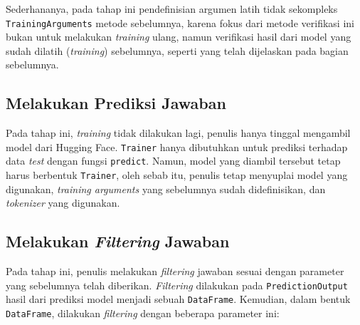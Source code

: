 Sederhananya, pada tahap ini pendefinisian argumen latih tidak sekompleks \texttt{TrainingArguments} metode sebelumnya, karena fokus dari metode verifikasi ini bukan untuk melakukan \emph{training} ulang, namun verifikasi hasil dari model yang sudah dilatih (\emph{training}) sebelumnya, seperti yang telah dijelaskan pada bagian sebelumnya.

\subsection{Melakukan Prediksi Jawaban}
Pada tahap ini, \emph{training} tidak dilakukan lagi, penulis hanya tinggal mengambil model dari Hugging Face. \texttt{Trainer} hanya dibutuhkan untuk prediksi terhadap data \emph{test} dengan fungsi \texttt{predict}. Namun, model yang diambil tersebut tetap harus berbentuk \texttt{Trainer}, oleh sebab itu, penulis tetap menyuplai model yang digunakan, \emph{training arguments} yang sebelumnya sudah didefinisikan, dan \emph{tokenizer} yang digunakan.

\subsection{Melakukan \emph{Filtering} Jawaban}
Pada tahap ini, penulis melakukan \emph{filtering} jawaban sesuai dengan parameter yang sebelumnya telah diberikan. \emph{Filtering} dilakukan pada \texttt{PredictionOutput} hasil dari prediksi model menjadi sebuah \texttt{DataFrame}. Kemudian, dalam bentuk \texttt{DataFrame}, dilakukan \emph{filtering} dengan beberapa parameter ini: 

